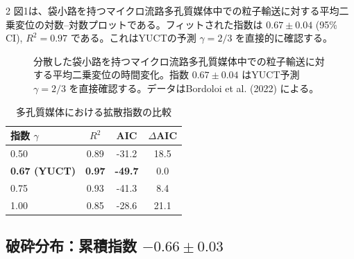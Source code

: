 \documentclass[11pt,a4paper]{article}
\begin{document}
\begin{multicols}{2}
		図1は、袋小路を持つマイクロ流路多孔質媒体中での粒子輸送に対する平均二乗変位の対数–対数プロットである。フィットされた指数は \(0.67 \pm 0.04\) (95\% CI), \(R^2 = 0.97\) である。これはYUCTの予測 \(\gamma = 2/3\) を直接的に確認する。
		
		\begin{figure}[htbp]
			\centering
			\caption{分散した袋小路を持つマイクロ流路多孔質媒体中での粒子輸送に対する平均二乗変位の時間変化。指数 \(0.67 \pm 0.04\) はYUCT予測 \(\gamma = 2/3\) を直接確認する。データはBordoloi et al. (2022) \cite{Bordoloi2022} による。}
			\label{fig:diffusion}
		\end{figure}
		
		\begin{table}[htbp]
			\centering
			\caption{多孔質媒体における拡散指数の比較}
			\label{tab:diffusion}
			\begin{tabular}{lccc}
				\toprule
				指数 \(\gamma\) & \(R^2\) & AIC & \(\Delta\)AIC \\
				\midrule
				0.50 & 0.89 & -31.2 & 18.5 \\
				\textbf{0.67 (YUCT)} & \textbf{0.97} & \textbf{-49.7} & 0.0 \\
				0.75 & 0.93 & -41.3 & 8.4 \\
				1.00 & 0.85 & -28.6 & 21.1 \\
				\bottomrule
			\end{tabular}
		\end{table}
		
		\subsection{破砕分布：累積指数 \(-0.66 \pm 0.03\)}
		

\end{multicols}
\end{document}
